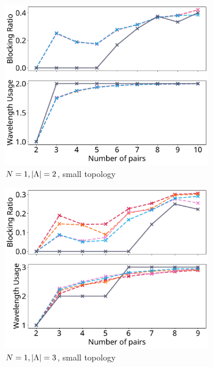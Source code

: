 \begin{figure}[H]
	\centering
\begin{subfigure}{0.32\textwidth}
	\includegraphics[width=\textwidth]{pictures/plots/n_pairs/cc/x-1-2-s.pdf}
	\caption{\scriptsize $N=1, \lvert\Lambda\rvert = 2$, small topology}
\end{subfigure}
\begin{subfigure}{0.32\textwidth}
	\includegraphics[width=\textwidth]{pictures/plots/n_pairs/cc/x-1-3-s.pdf}
	\caption{\scriptsize $N=1, \lvert\Lambda\rvert = 3$, small topology}
\end{subfigure}
\begin{subfigure}{0.32\textwidth}

\end{subfigure}
\end{figure}
